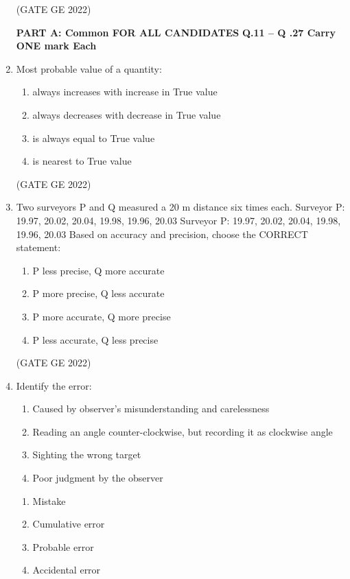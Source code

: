 \documentclass[journal,12pt,onecolumn]{IEEEtran}
\theoremstyle{remark}
\begin{document}
\begin{enumerate}
\hfill (GATE GE 2022)

\textbf{PART A: Common FOR ALL CANDIDATES}
\textbf{Q.11 – Q .27 Carry ONE mark Each}

\item Most probable value of a quantity:
\begin{enumerate}
    \item always increases with increase in True value
    \item always decreases with decrease in True value
    \item is always equal to True value
    \item is nearest to True value
\end{enumerate}

\hfill (GATE GE 2022)

\item Two surveyors P and Q measured a 20 m distance six times each.
Surveyor P: 19.97, 20.02, 20.04, 19.98, 19.96, 20.03
Surveyor P: 19.97, 20.02, 20.04, 19.98, 19.96, 20.03
Based on accuracy and precision, choose the CORRECT statement:
\begin{enumerate}
    \item P less precise, Q more accurate
    \item P more precise, Q less accurate
    \item P more accurate, Q more precise
    \item P less accurate, Q less precise
\end{enumerate}

\hfill (GATE GE 2022)

\item Identify the error:
\begin{enumerate}
\item Caused by observer’s misunderstanding and carelessness 
\item Reading an angle counter-clockwise, but recording it as clockwise angle 
\item Sighting the wrong target 
\item Poor judgment by the observer 
\end{enumerate}

\begin{enumerate}
    \item Mistake
    \item Cumulative error
    \item Probable error
    \item Accidental error
\end{enumerate}


\end{enumerate}
\end{document}
